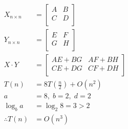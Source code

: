 \begin{align*}
	X_{n \times n}  & = \begin{bmatrix}
		                    A & B \\
		                    C & D \\
	                    \end{bmatrix}                      \\
	Y_{n \times n}  & = \begin{bmatrix}
		                    E & F \\
		                    G & H \\
	                    \end{bmatrix}                      \\
	X \cdot Y       & = \begin{bmatrix}
		                    AE + BG & AF + BH \\
		                    CE + DG & CF + DH \\
	                    \end{bmatrix}                   \\
	T(n)            & = 8T\left(\frac{n}{2}\right) + O(n^2) \\
	a               & = 8, \; b = 2, \; d = 2               \\
	\log_b a        & = \log_2 8 = 3 > 2                    \\
	\therefore T(n) & = O(n^3)
\end{align*}


